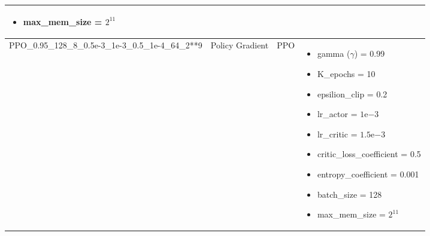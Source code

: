 \begin{longtable}[h]{|p{3.5cm}|p{2.5cm}|p{1.5cm}|p{6cm}|}
\begin{itemize}
		\item max\_mem\_size = $2^{11}$
	\end{itemize} 
	\\
	\hline
	PPO\_0.95\_128\_8\_0.5e-3\_1e-3\_0.5\_1e-4\_64\_2**9 & Policy Gradient & PPO & 
	\begin{itemize}
		\item gamma ($\gamma$) = 0.99
		\item K\_epochs = 10
		\item epsilion\_clip = 0.2
		\item lr\_actor = $1\mathrm{e}{-3}$
		\item lr\_critic = $1.5\mathrm{e}{-3}$
		\item critic\_loss\_coefficient = 0.5
		\item entropy\_coefficient = 0.001
		\item batch\_size = 128
		\item max\_mem\_size = $2^{11}$
	\end{itemize} 
	\\
	\hline
\end{longtable}